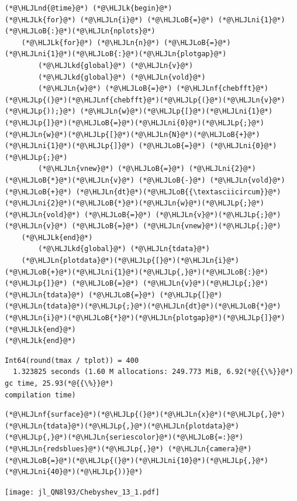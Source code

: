 \documentclass[12pt,a4paper]{article}
\newcommand{\HLJLk}[1]{\textcolor[RGB]{148,91,176}{\textbf{#1}}}
\newcommand{\HLJLkd}[1]{\textcolor[RGB]{214,102,97}{\textit{#1}}}
\newcommand{\HLJLn}[1]{#1}
\newcommand{\HLJLnd}[1]{\textcolor[RGB]{214,102,97}{#1}}
\newcommand{\HLJLnf}[1]{\textcolor[RGB]{66,102,213}{#1}}
\newcommand{\HLJLni}[1]{\textcolor[RGB]{59,151,46}{#1}}
\newcommand{\HLJLoB}[1]{\textcolor[RGB]{102,102,102}{\textbf{#1}}}
\newcommand{\HLJLp}[1]{#1}
\begin{document}
\begin{lstlisting}
(*@\HLJLnd{@time}@*) (*@\HLJLk{begin}@*)
(*@\HLJLk{for}@*) (*@\HLJLn{i}@*) (*@\HLJLoB{=}@*) (*@\HLJLni{1}@*)(*@\HLJLoB{:}@*)(*@\HLJLn{nplots}@*)
    (*@\HLJLk{for}@*) (*@\HLJLn{n}@*) (*@\HLJLoB{=}@*) (*@\HLJLni{1}@*)(*@\HLJLoB{:}@*)(*@\HLJLn{plotgap}@*)
        (*@\HLJLkd{global}@*) (*@\HLJLn{v}@*)
        (*@\HLJLkd{global}@*) (*@\HLJLn{vold}@*)
        (*@\HLJLn{w}@*) (*@\HLJLoB{=}@*) (*@\HLJLnf{chebfft}@*)(*@\HLJLp{(}@*)(*@\HLJLnf{chebfft}@*)(*@\HLJLp{(}@*)(*@\HLJLn{v}@*)(*@\HLJLp{));}@*) (*@\HLJLn{w}@*)(*@\HLJLp{[}@*)(*@\HLJLni{1}@*)(*@\HLJLp{]}@*)(*@\HLJLoB{=}@*)(*@\HLJLni{0}@*)(*@\HLJLp{;}@*) (*@\HLJLn{w}@*)(*@\HLJLp{[}@*)(*@\HLJLn{N}@*)(*@\HLJLoB{+}@*)(*@\HLJLni{1}@*)(*@\HLJLp{]}@*) (*@\HLJLoB{=}@*) (*@\HLJLni{0}@*)(*@\HLJLp{;}@*)
        (*@\HLJLn{vnew}@*) (*@\HLJLoB{=}@*) (*@\HLJLni{2}@*)(*@\HLJLoB{*}@*)(*@\HLJLn{v}@*) (*@\HLJLoB{-}@*) (*@\HLJLn{vold}@*) (*@\HLJLoB{+}@*) (*@\HLJLn{dt}@*)(*@\HLJLoB{{\textasciicircum}}@*)(*@\HLJLni{2}@*)(*@\HLJLoB{*}@*)(*@\HLJLn{w}@*)(*@\HLJLp{;}@*) (*@\HLJLn{vold}@*) (*@\HLJLoB{=}@*) (*@\HLJLn{v}@*)(*@\HLJLp{;}@*) (*@\HLJLn{v}@*) (*@\HLJLoB{=}@*) (*@\HLJLn{vnew}@*)(*@\HLJLp{;}@*)
    (*@\HLJLk{end}@*)
        (*@\HLJLkd{global}@*) (*@\HLJLn{tdata}@*)
    (*@\HLJLn{plotdata}@*)(*@\HLJLp{[}@*)(*@\HLJLn{i}@*)(*@\HLJLoB{+}@*)(*@\HLJLni{1}@*)(*@\HLJLp{,}@*)(*@\HLJLoB{:}@*)(*@\HLJLp{]}@*) (*@\HLJLoB{=}@*) (*@\HLJLn{v}@*)(*@\HLJLp{;}@*) (*@\HLJLn{tdata}@*) (*@\HLJLoB{=}@*) (*@\HLJLp{[}@*)(*@\HLJLn{tdata}@*)(*@\HLJLp{;}@*)(*@\HLJLn{dt}@*)(*@\HLJLoB{*}@*)(*@\HLJLn{i}@*)(*@\HLJLoB{*}@*)(*@\HLJLn{plotgap}@*)(*@\HLJLp{]}@*)
(*@\HLJLk{end}@*)
(*@\HLJLk{end}@*)
\end{lstlisting}

\begin{lstlisting}
Int64(round(tmax / tplot)) = 400
  1.323825 seconds (1.60 M allocations: 249.773 MiB, 6.92(*@{{\%}}@*) gc time, 25.93(*@{{\%}}@*) 
compilation time)
\end{lstlisting}


\begin{lstlisting}
(*@\HLJLnf{surface}@*)(*@\HLJLp{(}@*)(*@\HLJLn{x}@*)(*@\HLJLp{,}@*)(*@\HLJLn{tdata}@*)(*@\HLJLp{,}@*)(*@\HLJLn{plotdata}@*)(*@\HLJLp{,}@*)(*@\HLJLn{seriescolor}@*)(*@\HLJLoB{=:}@*)(*@\HLJLn{redsblues}@*)(*@\HLJLp{,}@*) (*@\HLJLn{camera}@*)(*@\HLJLoB{=}@*)(*@\HLJLp{(}@*)(*@\HLJLni{10}@*)(*@\HLJLp{,}@*)(*@\HLJLni{40}@*)(*@\HLJLp{))}@*)
\end{lstlisting}

\texttt{[image: jl\_QN8l93/Chebyshev\_13\_1.pdf]}
\end{document}
